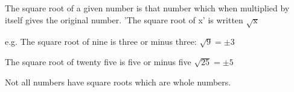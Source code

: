 The square root of a given number is that number which when multiplied 
by itself gives the original 
number. 'The square root of x' is written $ \sqrt {\mathrm{x}} $

\par
e.g. The square root of nine is three or minus three: $ \sqrt {9} = \pm 3 $ 
\par
     The square root of twenty five is five or minus five $ \sqrt {25} = \pm 5 $

\par
Not all numbers have square roots which are whole numbers.